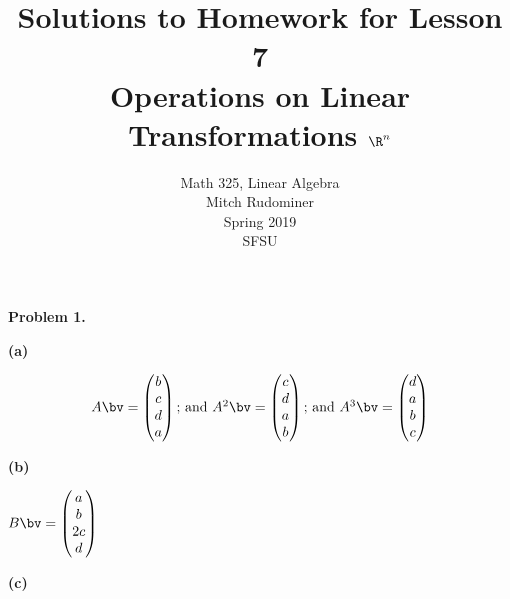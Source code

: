 \documentclass[oneside,12pt]{amsart}
\begin{document}
\title{Solutions to Homework for Lesson 7 \\ Operations on Linear Transformations $\R^n$}
\author{Math 325, Linear Algebra \\ Mitch Rudominer \\ Spring 2019 \\ SFSU }
\date{}

\maketitle

\textbf{Problem 1.}

\textbf{(a)}

$$
\begin{matrix}
A \bv =
\begin{pmatrix}
b \\
c \\
d \\
a \\
\end{pmatrix}
\text{; and }
A^2\bv =
\begin{pmatrix}
c \\
d \\
a \\
b \\
\end{pmatrix}
\text{; and }
A^3\bv =
\begin{pmatrix}
d \\
a \\
b \\
c \\
\end{pmatrix}
\end{matrix}
$$


\textbf{(b)}

$
B\bv =
\begin{pmatrix}
a \\
b \\
2c \\
d \\
\end{pmatrix}
$


\textbf{(c)}
\end{document}
